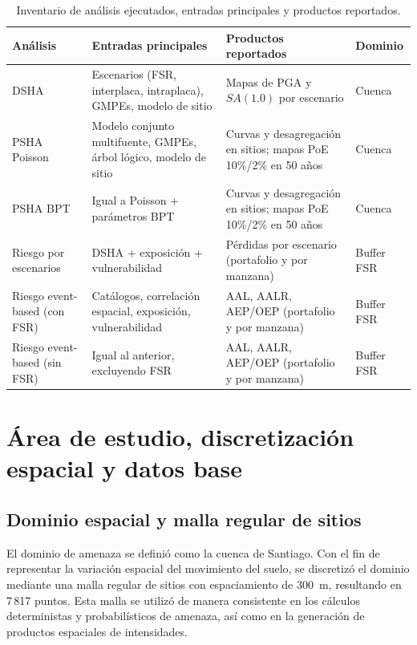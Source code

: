 \begin{table}[htbp]
\centering
\caption{Inventario de análisis ejecutados, entradas principales y productos reportados.}
\label{tab:meto_inventario_analisis}
\small
\begin{tabularx}{\textwidth}{@{}>{\raggedright\arraybackslash}p{2.7cm} >{\raggedright\arraybackslash}X >{\raggedright\arraybackslash}X >{\raggedright\arraybackslash}p{2.7cm}@{}}
\toprule
\textbf{Análisis} & \textbf{Entradas principales} & \textbf{Productos reportados} & \textbf{Dominio} \\
\midrule
DSHA & Escenarios (FSR, interplaca, intraplaca), GMPEs, modelo de sitio & Mapas de PGA y $SA(1.0)$ por escenario & Cuenca \\
PSHA Poisson & Modelo conjunto multifuente, GMPEs, árbol lógico, modelo de sitio & Curvas y desagregación en sitios; mapas PoE 10\%/2\% en 50 años & Cuenca \\
PSHA BPT & Igual a Poisson + parámetros BPT & Curvas y desagregación en sitios; mapas PoE 10\%/2\% en 50 años & Cuenca \\
Riesgo por escenarios & DSHA + exposición + vulnerabilidad & Pérdidas por escenario (portafolio y por manzana) & Buffer FSR \\
Riesgo event-based (con FSR) & Catálogos, correlación espacial, exposición, vulnerabilidad & AAL, AALR, AEP/OEP (portafolio y por manzana) & Buffer FSR \\
Riesgo event-based (sin FSR) & Igual al anterior, excluyendo FSR & AAL, AALR, AEP/OEP (portafolio y por manzana) & Buffer FSR \\
\bottomrule
\end{tabularx}
\end{table}

\section{Área de estudio, discretización espacial y datos base}
\label{sec:meto_area_datos}

\subsection{Dominio espacial y malla regular de sitios}
\label{sec:meto_malla_sitios}

El dominio de amenaza se definió como la cuenca de Santiago. Con el fin de representar la variación espacial del movimiento del suelo, se discretizó el dominio mediante una malla regular de sitios con espaciamiento de 300~m, resultando en 7\,817 puntos. Esta malla se utilizó de manera consistente en los cálculos deterministas y probabilísticos de amenaza, así como en la generación de productos espaciales de intensidades.

